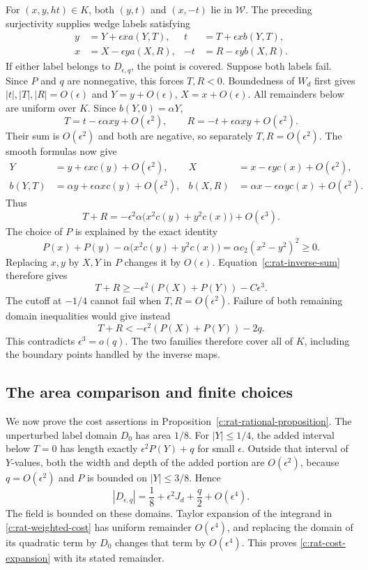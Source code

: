 For $(x,y,ht)\in K$, both $(y,t)$ and $(x,-t)$ lie in $\mathcal W$.
The preceding surjectivity supplies wedge labels satisfying
\begin{align*}
 y&=Y+\epsilon xa(Y,T),&t&=T+\epsilon xb(Y,T),\\
 x&=X-\epsilon ya(X,R),&-t&=R-\epsilon yb(X,R).
\end{align*}
If either label belongs to $D_{\epsilon,q}$, the point is covered.
Suppose both labels fail.  Since $P$ and $q$ are nonnegative, this
forces $T,R<0$.  Boundedness of $W_d$ first gives
$|t|,|T|,|R|=O(\epsilon)$ and $Y=y+O(\epsilon)$,
$X=x+O(\epsilon)$.  All remainders below are uniform over $K$.
Since $b(Y,0)=\alpha Y$,
\[
 T=t-\epsilon\alpha xy+O(\epsilon^2),\qquad
 R=-t+\epsilon\alpha xy+O(\epsilon^2).
\]
Their sum is $O(\epsilon^2)$ and both are negative, so separately
$T,R=O(\epsilon^2)$.  The smooth formulas now give
\begin{align*}
 Y&=y+\epsilon xc(y)+O(\epsilon^2),&
 X&=x-\epsilon yc(x)+O(\epsilon^2),\\
 b(Y,T)&=\alpha y+\epsilon\alpha xc(y)+O(\epsilon^2),&
 b(X,R)&=\alpha x-\epsilon\alpha yc(x)+O(\epsilon^2).
\end{align*}
Thus
\begin{equation}\label{c:rat-inverse-sum}
 T+R=-\epsilon^2\alpha\bigl(x^2c(y)+y^2c(x)\bigr)+O(\epsilon^3).
\end{equation}
The choice of $P$ is explained by the exact identity
\begin{equation}\label{c:rat-square-surplus}
 P(x)+P(y)-\alpha\bigl(x^2c(y)+y^2c(x)\bigr)
       =\alpha c_2(x^2-y^2)^2\ge0.
\end{equation}
Replacing $x,y$ by $X,Y$ in $P$ changes it by $O(\epsilon)$.
Equation~\eqref{c:rat-inverse-sum} therefore gives
\[
 T+R\ge-\epsilon^2(P(X)+P(Y))-C\epsilon^3.
\]
The cutoff at $-1/4$ cannot fail when $T,R=O(\epsilon^2)$.
Failure of both remaining domain inequalities would give instead
\[
 T+R<-\epsilon^2(P(X)+P(Y))-2q.
\]
This contradicts $\epsilon^3=o(q)$.  The two families therefore cover
all of $K$, including the boundary points handled by the inverse maps.

\subsection{The area comparison and finite choices}
\label{c:rat-area}

We now prove the cost assertions in Proposition~\ref{c:rat-rational-proposition}.
The unperturbed label domain $D_0$ has area $1/8$.  For
$|Y|\le1/4$, the added interval below $T=0$ has length exactly
$\epsilon^2P(Y)+q$ for small $\epsilon$.  Outside that interval of
$Y$-values, both the width and depth of the added portion are
$O(\epsilon^2)$, because $q=O(\epsilon^2)$ and $P$ is bounded on
$|Y|\le3/8$.  Hence
\[
 |D_{\epsilon,q}|=\frac18+\epsilon^2J_d+\frac q2+O(\epsilon^4).
\]
The field is bounded on these domains.  Taylor expansion of the
integrand in \eqref{c:rat-weighted-cost} has uniform remainder
$O(\epsilon^4)$, and replacing the domain of its quadratic term by
$D_0$ changes that term by $O(\epsilon^4)$.  This proves
\eqref{c:rat-cost-expansion} with its stated remainder.

